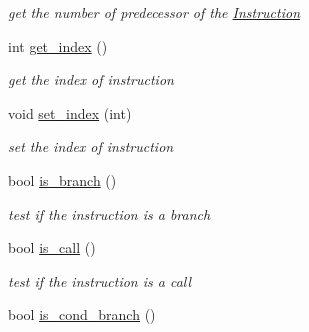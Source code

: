 \begin{DoxyCompactItemize}
\begin{DoxyCompactList}\small\item\em get the number of predecessor of the \hyperlink{classInstruction}{Instruction} \item\end{DoxyCompactList}\item 
\hypertarget{classInstruction_a14c5f91c242a5b58eda9f123ad331cbe}{
int \hyperlink{classInstruction_a14c5f91c242a5b58eda9f123ad331cbe}{get\_\-index} ()}
\label{classInstruction_a14c5f91c242a5b58eda9f123ad331cbe}

\begin{DoxyCompactList}\small\item\em get the index of instruction \item\end{DoxyCompactList}\item 
\hypertarget{classInstruction_af1608cfea660c46e8a8b4bbac948406a}{
void \hyperlink{classInstruction_af1608cfea660c46e8a8b4bbac948406a}{set\_\-index} (int)}
\label{classInstruction_af1608cfea660c46e8a8b4bbac948406a}

\begin{DoxyCompactList}\small\item\em set the index of instruction \item\end{DoxyCompactList}\item 
\hypertarget{classInstruction_aab8e6a16b8bab5ca90b554086cc3c825}{
bool \hyperlink{classInstruction_aab8e6a16b8bab5ca90b554086cc3c825}{is\_\-branch} ()}
\label{classInstruction_aab8e6a16b8bab5ca90b554086cc3c825}

\begin{DoxyCompactList}\small\item\em test if the instruction is a branch \item\end{DoxyCompactList}\item 
\hypertarget{classInstruction_ab2a6352a09271a588f6930852a361f67}{
bool \hyperlink{classInstruction_ab2a6352a09271a588f6930852a361f67}{is\_\-call} ()}
\label{classInstruction_ab2a6352a09271a588f6930852a361f67}

\begin{DoxyCompactList}\small\item\em test if the instruction is a call \item\end{DoxyCompactList}\item 
\hypertarget{classInstruction_a1b607074554bc160142786c125bde530}{
bool \hyperlink{classInstruction_a1b607074554bc160142786c125bde530}{is\_\-cond\_\-branch} ()}
\label{classInstruction_a1b607074554bc160142786c125bde530}


\end{DoxyCompactItemize}
